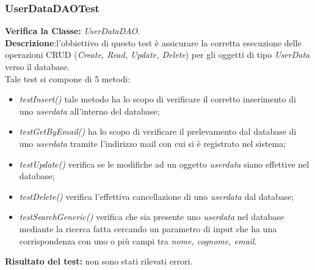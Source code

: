 \subsubsection{UserDataDAOTest}
\textbf{Verifica la Classe:} \textit{UserDataDAO}.\\
\textbf{Descrizione}:l'obbiettivo di questo test è assicurare la corretta esecuzione delle operazioni CRUD (\textit{Create, Read, Update, Delete}) per gli oggetti di tipo \textit{UserData} verso il database. \\
Tale test si compone di 5 metodi:
\begin{itemize}
\item \textit{testInsert()} tale metodo ha lo scopo di verificare il corretto inserimento di uno \textit{userdata} all'interno del database;
\item \textit{testGetByEmail()} ha lo scopo di verificare il prelevamento dal database di uno \textit{userdata} tramite l'indirizzo mail con cui si è registrato nel sistema;
\item \textit{testUpdate() } verifica se le modifiche ad un oggetto \textit{userdata} siano effettive nel database;
\item \textit{testDelete() } verifica l'effettiva cancellazione di uno \textit{userdata} dal database;
\item \textit{testSearchGeneric()} verifica che sia presente uno \textit{userdata} nel database mediante la ricerca fatta cercando un parametro di input che ha una corrispondenza con uno o più campi tra \textit{nome, cognome, email}.
\end{itemize}
\textbf{Risultato del test:} non sono stati rilevati errori.

